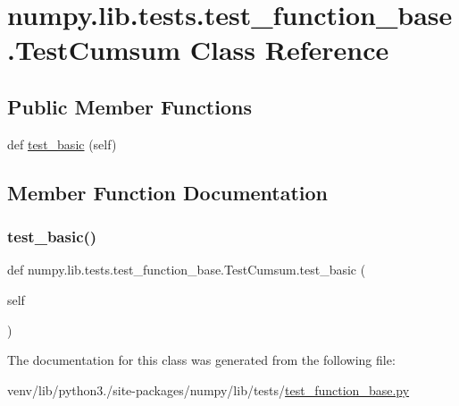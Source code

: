 \hypertarget{classnumpy_1_1lib_1_1tests_1_1test__function__base_1_1TestCumsum}{}\section{numpy.\+lib.\+tests.\+test\+\_\+function\+\_\+base.\+Test\+Cumsum Class Reference}
\label{classnumpy_1_1lib_1_1tests_1_1test__function__base_1_1TestCumsum}
\subsection*{Public Member Functions}
\begin{DoxyCompactItemize}
\item 
def \hyperlink{classnumpy_1_1lib_1_1tests_1_1test__function__base_1_1TestCumsum_ae5f68281f04968a01382b3a5a579d100}{test\+\_\+basic} (self)
\end{DoxyCompactItemize}


\subsection{Member Function Documentation}
\mbox{\label{classnumpy_1_1lib_1_1tests_1_1test__function__base_1_1TestCumsum_ae5f68281f04968a01382b3a5a579d100}} 
\subsubsection{\texorpdfstring{test\+\_\+basic()}{test\_basic()}}
{\footnotesize\ttfamily def numpy.\+lib.\+tests.\+test\+\_\+function\+\_\+base.\+Test\+Cumsum.\+test\+\_\+basic (\begin{DoxyParamCaption}\item[{}]{self }\end{DoxyParamCaption})}



The documentation for this class was generated from the following file\+:\begin{DoxyCompactItemize}
\item 
venv/lib/python3./site-\/packages/numpy/lib/tests/\hyperlink{lib_2tests_2test__function__base_8py}{test\+\_\+function\+\_\+base.\+py}\end{DoxyCompactItemize}

